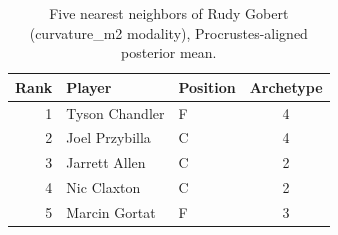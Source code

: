 \begin{table}[htbp]
  \centering\small
  \begin{tabular}{rllc}
    \toprule
    Rank & Player & Position & Archetype \\
    \midrule
    1 & Tyson Chandler & F & 4 \\
    2 & Joel Przybilla & C & 4 \\
    3 & Jarrett Allen & C & 2 \\
    4 & Nic Claxton & C & 2 \\
    5 & Marcin Gortat & F & 3 \\
    \bottomrule
  \end{tabular}
  \caption{Five nearest neighbors of Rudy Gobert (curvature_m2 modality), Procrustes-aligned posterior mean.}
  \label{tab:Rudy_Gobert_neighbors_curvature_m2}
\end{table}

